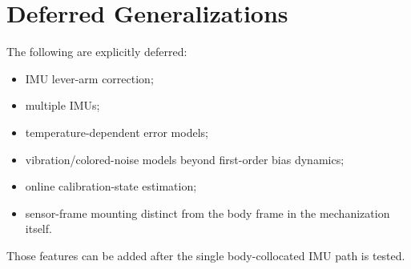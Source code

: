 \section{Deferred Generalizations}

The following are explicitly deferred:
\begin{itemize}
    \item IMU lever-arm correction;
    \item multiple IMUs;
    \item temperature-dependent error models;
    \item vibration/colored-noise models beyond first-order bias dynamics;
    \item online calibration-state estimation;
    \item sensor-frame mounting distinct from the body frame in the
    mechanization itself.
\end{itemize}

Those features can be added after the single body-collocated IMU path is tested.
